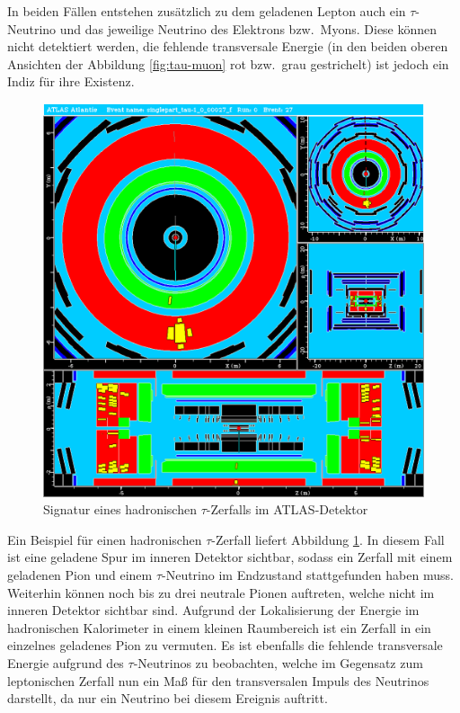 \documentclass[11pt, a4paper]{article}
\numberwithin{equation}{section}
\begin{document}
In beiden Fällen entstehen zusätzlich zu dem geladenen Lepton auch ein $\tau$-Neutrino und das jeweilige Neutrino des Elektrons bzw.\ Myons.
Diese können nicht detektiert werden, die fehlende transversale Energie (in den beiden oberen Ansichten der Abbildung \ref{fig:tau-muon} rot bzw.\ grau gestrichelt) ist jedoch ein Indiz für ihre Existenz.
\vfill

\clearpage
\begin{figure}[htbp]
	\centering
	\includegraphics[width=1.0\textwidth]{./data/atlantis/singlepart_events_new/tau/single_pion.png}
	\caption{Signatur eines hadronischen $\tau$-Zerfalls im ATLAS-Detektor}
	\label{fig:tau-pion}
\end{figure}
\vfill
\noindent
Ein Beispiel für einen hadronischen $\tau$-Zerfall liefert Abbildung \ref{fig:tau-pion}.
In diesem Fall ist eine geladene Spur im inneren Detektor sichtbar, sodass ein Zerfall mit einem geladenen Pion und einem $\tau$-Neutrino im Endzustand stattgefunden haben muss.
Weiterhin können noch bis zu drei neutrale Pionen auftreten, welche nicht im inneren Detektor sichtbar sind.
Aufgrund der Lokalisierung der Energie im hadronischen Kalorimeter in einem kleinen Raumbereich ist ein Zerfall in ein einzelnes geladenes Pion zu vermuten.
Es ist ebenfalls die fehlende transversale Energie aufgrund des $\tau$-Neutrinos zu beobachten, welche im Gegensatz zum leptonischen Zerfall nun ein Maß für den transversalen Impuls des Neutrinos darstellt, da nur ein Neutrino bei diesem Ereignis auftritt.
\vfill
\end{document}

